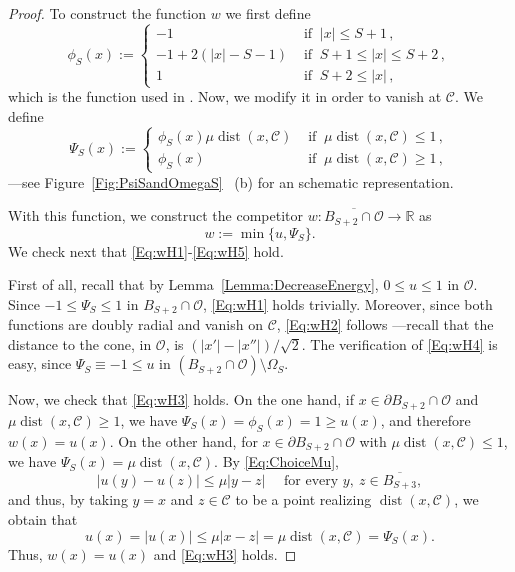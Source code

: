 \documentclass[12pt,reqno]{amsart}
\theoremstyle{definition}
\theoremstyle{remark}
\newcommand{\con}[1]{\mathbb{#1}}
\newcommand{\R}{\con{R}} %
\newcommand{\ccal}{\mathscr{C}}
\newcommand{\ocal}{\mathcal{O}}
\DeclareMathOperator{\dist}{dist}
\numberwithin{equation}{section}
\begin{document}
\begin{proof}
	To construct the function $w$ we first define
	\begin{equation}
		\label{Eq:DefOfPhiS}
		\phi_S(x):= 
		\begin{cases}
		-1 & \textrm{ if }  \ |x| \leq S+1\,, \\
		-1 + 2 (|x| - S-1)&  \textrm{ if } \ S+1 \leq |x| \leq S+2\,, \\
		1 & \textrm{ if }  \  S+2 \leq |x|\,,
		\end{cases}
	\end{equation}
	which is the function used in \cite{SavinValdinoci-EnergyEstimate}. Now, we modify it in order to vanish at $\ccal$. We define
	$$
	\Psi_S(x) :=
	\begin{cases}
	\phi_S (x) \mu\dist(x,\ccal) &  \textrm{ if }  \  \mu\dist(x,\ccal) \leq 1 \,, \\
	\phi_S (x) & \textrm{ if }  \  \mu\dist(x,\ccal) \geq 1\,,
	\end{cases}
	$$
	---see Figure~\ref{Fig:PsiSandOmegaS}~ (b) for an schematic representation.
	
	With this function, we construct the competitor  $w:\overline{B_{S+2} \cap \ocal} \to \R$ as
	$$
	w:= \min \{u, \Psi_S\}.
	$$
	We check next that \eqref{Eq:wH1}-\eqref{Eq:wH5} hold.
	
	First of all, recall that by Lemma~\ref{Lemma:DecreaseEnergy}, $0\leq u \leq 1$ in $\ocal$. Since $-1\leq \Psi_S\leq 1$ in $B_{S+2} \cap \ocal$, \eqref{Eq:wH1} holds trivially. Moreover, since both functions are doubly radial and vanish on $\ccal$, \eqref{Eq:wH2} follows ---recall that the distance to the cone, in $\ocal$, is $(|x'|-|x''|)/\sqrt{2}$. The verification of \eqref{Eq:wH4} is easy, since $\Psi_S \equiv-1 \leq u$ in $(B_{S+2}\cap \ocal)\setminus \Omega_S$.
	
	Now, we check that \eqref{Eq:wH3} holds. On the one hand, if $x\in \partial B_{S+2}\cap \ocal$ and $\mu\dist(x,\ccal) \geq 1$, we have $\Psi_S (x) = \phi_S(x) = 1 \geq u(x)$, and therefore $w(x) = u(x)$. On the other hand, for $x\in \partial B_{S+2}\cap \ocal$ with $\mu\dist(x,\ccal) \leq 1$, we have $\Psi_S (x) = \mu \dist (x,\ccal)$. By \eqref{Eq:ChoiceMu},
	$$ 
	|u(y) - u(z)|\leq \mu |y-z| \quad \text{ for every } y, \ z \in \overline{B_{S+3}},
	$$ 
	and thus, by taking $y=x$ and $z\in \ccal$ to be a point realizing $\dist(x,\ccal)$, we obtain that
	$$ 
	u(x) = |u(x)|\leq \mu |x-z|  = \mu \dist (x,\ccal) = \Psi_S (x).
	$$ 
	Thus, $w(x) = u(x)$ and \eqref{Eq:wH3} holds.
	

\end{proof}
\end{document}
